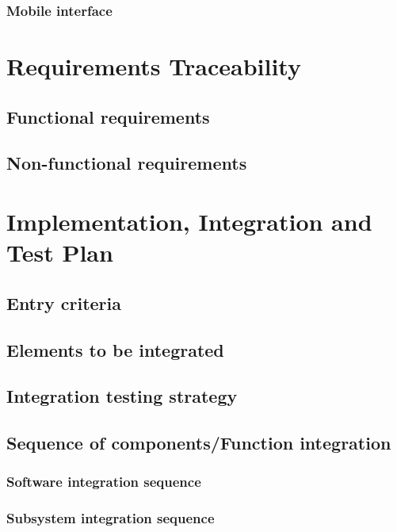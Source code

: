 \documentclass{article}
\begin{document}
	\subsubsection{Mobile interface}


	\section{Requirements Traceability}


	\subsection{Functional requirements}


	\subsection{Non-functional requirements}


	\section{Implementation, Integration and Test Plan}


	\subsection{Entry criteria}


	\subsection{Elements to be integrated}


	\subsection{Integration testing strategy}


	\subsection{Sequence of components/Function integration}


	\subsubsection{Software integration sequence}


	\subsubsection{Subsystem integration sequence}
\end{document}
